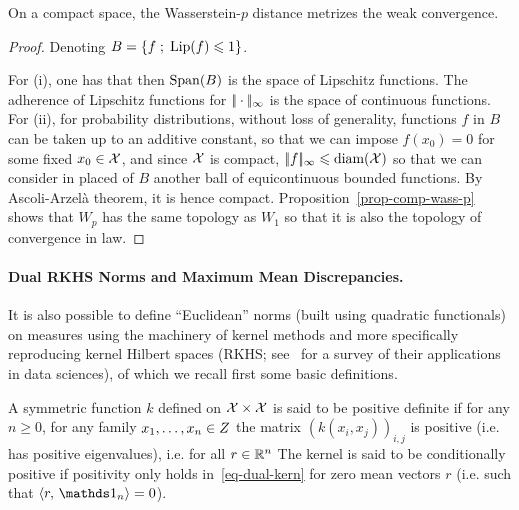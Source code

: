 \begin{cor}\label{cor-topol-wass}
	On a compact space, the Wasserstein-$p$ distance metrizes the weak convergence. 
\end{cor}
\begin{proof}
	Denoting $B=\left\{ f \;;\; \text{Lip}(f) \leqslant 1 \right\}$.
	
	For (i), one has that  then $\operatorname{Span}(B)$ is the space of Lipschitz functions.
	The adherence of Lipschitz functions for $|\!| \cdot |\!|_\infty$ is the space of continuous functions.
	For (ii), for probability distributions, without loss of generality, functions $f$ in $B$ can be taken up to an additive constant, so that we can impose $f(x_0)=0$ for some fixed $x_0 \in \mathcal{X}$, and since $\mathcal{X}$ is compact, $|\!| f |\!|_\infty \leqslant \text{diam}(\mathcal{X})$ so that we can consider in placed of $B$ another ball of equicontinuous bounded functions. By Ascoli-Arzel\`a theorem, it is hence compact. 	
	Proposition~\ref{prop-comp-wass-p} shows that $W_p$ has the same topology as $W_1$ so that it is also the topology of convergence in law. 
\end{proof}





\paragraph{Dual RKHS Norms and Maximum Mean Discrepancies.}

It is also possible to define ``Euclidean'' norms (built using quadratic functionals) on measures using the machinery of kernel methods and more specifically reproducing kernel Hilbert spaces (RKHS; see~\cite{scholkopf2002learning} for a survey of their applications in data sciences), of which we recall first some basic definitions.

\begin{defn}\label{def-negativedefinitekernel}
A symmetric function $k$ defined on $\mathcal{X} \times \mathcal{X}$ is said to be positive definite if for any $n\geq0$, for any family $x_1,\dots,x_n\in Z$ the matrix $(k(x_i,x_j))_{i,j}$ is positive (i.e. has positive eigenvalues), i.e.  for all $r \in \mathbb{R}^n$
The kernel is said to be conditionally positive if positivity only holds in~\eqref{eq-dual-kern} for zero mean vectors $r$ (i.e. such that $\dotp{r}{\ones_n}=0$).  
\end{defn}


